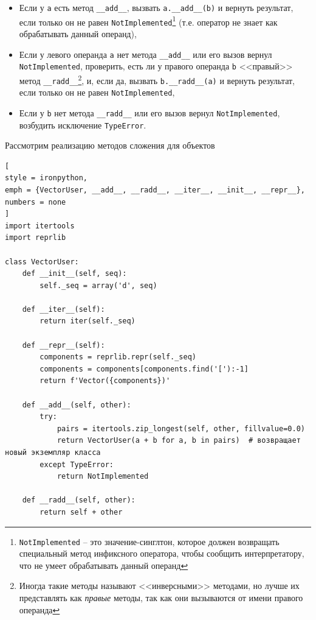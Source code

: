 \documentclass[%
	11pt,
	a4paper,
	utf8,
		]{article}
\begin{document}
\begin{itemize}
	\item Если у \texttt{a} есть метод \texttt{\_\_add\_\_}, вызвать \texttt{a.\_\_add\_\_(b)} и вернуть результат, если только он не равен \texttt{NotImplemented}\footnote{\texttt{NotImplemented} -- это значение-синглтон, которое должен возвращать специальный метод инфиксного оператора, чтобы сообщить интерпретатору, что не умеет обрабатывать данный операнд} (т.е. оператор не знает как обрабатывать данный операнд),
	
	\item Если у левого операнда \texttt{a} нет метода \texttt{\_\_add\_\_} или его вызов вернул \texttt{NotImplemented}, проверить, есть ли у правого операнда \texttt{b} <<правый>> метод \texttt{\_\_radd\_\_}\footnote{Иногда такие методы называют <<инверсными>> методами, но лучше их представлять как \emph{правые} методы, так как они вызываются от имени правого операнда}, и, если да, вызвать \texttt{b.\_\_radd\_\_(a)} и вернуть результат, если только он не равен \texttt{NotImplemented},
	
	\item Если у \texttt{b} нет метода \texttt{\_\_radd\_\_} или его вызов вернул \texttt{NotImplemented}, возбудить исключение \texttt{TypeError}.
\end{itemize}

Рассмотрим реализацию методов сложения для объектов

\begin{lstlisting}[
style = ironpython,
emph = {VectorUser, __add__, __radd__, __iter__, __init__, __repr__},
numbers = none
]
import itertools
import reprlib

class VectorUser:
    def __init__(self, seq):
        self._seq = array('d', seq)

    def __iter__(self):
        return iter(self._seq)

    def __repr__(self):
        components = reprlib.repr(self._seq)
        components = components[components.find('['):-1]
        return f'Vector({components})'

    def __add__(self, other):
        try:
            pairs = itertools.zip_longest(self, other, fillvalue=0.0)
            return VectorUser(a + b for a, b in pairs)  # возвращает новый экземпляр класса
        except TypeError:
            return NotImplemented

    def __radd__(self, other):
        return self + other
\end{lstlisting}
\end{document}

